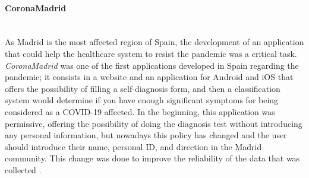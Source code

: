 \documentclass[a4paper, 12pt]{article}
\begin{document}
\paragraph{CoronaMadrid} \mbox{}\\

As Madrid is the most affected region of Spain, the development of an application that could help the healthcare system to resist the pandemic was a critical task. \textit{CoronaMadrid} \cite{coronamadrid-page} was one of the first applications developed in Spain regarding the pandemic; it consists in a website and an application for Android and iOS that offers the possibility of filling a self-diagnosis form, and then a classification system would determine if you have enough significant symptoms for being considered as a COVID-19 affected. In the beginning, this application was permissive, offering the possibility of doing the diagnosis test without introducing any personal information, but nowadays this policy has changed and the user should introduce their name, personal ID, and direction in the Madrid community. This change was done to improve the reliability of the data that was collected \cite{coronamadrid-privacy}. \\
\end{document}
